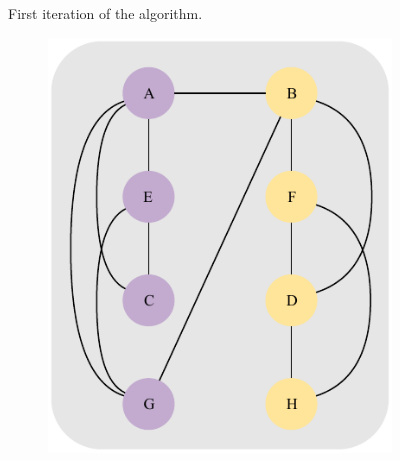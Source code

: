 \documentclass[a4paper, 10pt]{article}
\begin{document}
\begin{figure}[H]
\begin{subfigure}{0.19\textwidth}
    \end{subfigure}
    \caption{First iteration of the algorithm.}
\end{figure}
\begin{figure}[H]
    \centering
    \begin{subfigure}{0.19\textwidth}
        \centering
        \includegraphics[width=1\linewidth]{5_21.pdf}
    \end{subfigure}
    \hfill
    \begin{subfigure}{0.19\textwidth}
        \centering

\end{subfigure}
\end{figure}
\end{document}

